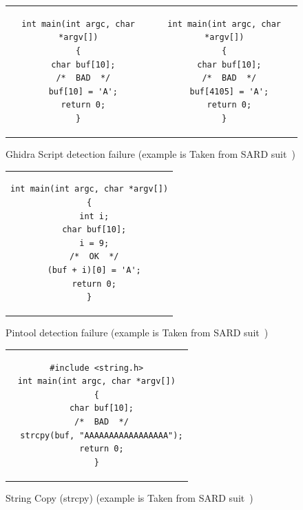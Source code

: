 \begin{figure}
\begin{centering}
\begin{tabular}{ c | c }
\begin{lstlisting}
int main(int argc, char *argv[])
{
  char buf[10];
  /*  BAD  */
  buf[10] = 'A';
  return 0;
}
\end{lstlisting}
&
\begin{lstlisting}
int main(int argc, char *argv[])
{
  char buf[10];
  /*  BAD  */
  buf[4105] = 'A';
  return 0;
}
\end{lstlisting}
\end{tabular}
\caption{Ghidra Script detection failure (example is Taken from SARD suit~\protect\citep{sardcite})\label{fig:fig44}}
\par\end{centering}
\end{figure}

\begin{figure}
\begin{centering}
\begin{tabular}{ c }
\begin{lstlisting}
int main(int argc, char *argv[])
{
  int i;
  char buf[10];
  i = 9;
  /*  OK  */
  (buf + i)[0] = 'A';
  return 0;
}
\end{lstlisting}
\end{tabular}
\caption{Pintool detection failure (example is Taken from SARD suit~\protect\citep{sardcite})\label{fig:fig45}}
\par\end{centering}
\end{figure}

\begin{figure}
\begin{centering}
\begin{tabular}{ c }
\begin{lstlisting}
#include <string.h>
int main(int argc, char *argv[])
{
  char buf[10];
  /*  BAD  */
  strcpy(buf, "AAAAAAAAAAAAAAAAA");
  return 0;
}
\end{lstlisting}
\end{tabular}
\caption{String Copy (strcpy) (example is Taken from SARD suit~\protect\citep{sardcite})\label{fig:fig46}}
\par\end{centering}
\end{figure}

